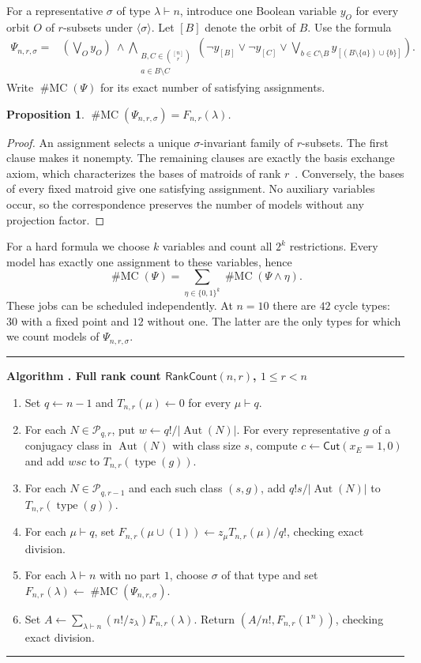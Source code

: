 \documentclass[11pt]{article}
\newtheorem{proposition}[theorem]{Proposition}
\theoremstyle{definition}
\newcounter{algorithm}
\newenvironment{algorithm}[1]{%
  \refstepcounter{algorithm}\par\medskip\noindent
  \begin{minipage}{\linewidth}\hrule\medskip
  \textbf{Algorithm \thealgorithm. #1}\par\smallskip
  \begin{enumerate}[label=\arabic*.,leftmargin=2.2em,itemsep=2pt,topsep=0pt]
}{\end{enumerate}\medskip\hrule\end{minipage}\par\medskip}
\DeclareMathOperator{\Aut}{Aut}
\DeclareMathOperator{\type}{type}
\newcommand{\mc}{\operatorname{\#MC}}
\newcommand{\Cut}{\mathsf{Cut}}
\newcommand{\Part}{\mathcal P}
\begin{document}
For a representative $\sigma$ of type $\lambda\vdash n$, introduce one
Boolean variable $y_O$ for every orbit $O$ of $r$-subsets under
$\langle\sigma\rangle$. Let $[B]$ denote the orbit of $B$. Use the formula
\begin{align}
\Psi_{n,r,\sigma}={}&\left(\bigvee_O y_O\right)\ \land
\bigwedge_{\substack{B,C\in\binom{[n]}r\\a\in B\setminus C}}
\left(\neg y_{[B]}\lor\neg y_{[C]}\lor
 \bigvee_{b\in C\setminus B}y_{[(B\setminus\{a\})\cup\{b\}]}\right).
\label{eq:bases}
\end{align}
Write $\mc(\Psi)$ for its exact number of satisfying assignments.

\begin{proposition}\label{prop:bases}
$\mc(\Psi_{n,r,\sigma})=F_{n,r}(\lambda)$.
\end{proposition}
\begin{proof}
An assignment selects a unique $\sigma$-invariant family of $r$-subsets.
The first clause makes it nonempty. The remaining clauses are exactly the
basis exchange axiom, which characterizes the bases of matroids of rank
$r$~\cite[Section 1.2]{Oxley}. Conversely, the bases of every fixed matroid give one satisfying
assignment. No auxiliary variables occur, so the correspondence preserves
the number of models without any projection factor.
\end{proof}

For a hard formula we choose $k$ variables and count all $2^k$ restrictions.
Every model has exactly one assignment to these variables, hence
\begin{equation}\label{eq:cubes}
\mc(\Psi)=\sum_{\eta\in\{0,1\}^k}\mc(\Psi\land\eta).
\end{equation}
These jobs can be scheduled independently. At $n=10$ there are $42$ cycle
types: $30$ with a fixed point and $12$ without one. The latter are the
only types for which we count models of $\Psi_{n,r,\sigma}$.

\begin{algorithm}{Full rank count $\mathsf{RankCount}(n,r)$, $1\le r<n$}
\label{alg:rank}
\item Set $q\gets n-1$ and $T_{n,r}(\mu)\gets0$ for every $\mu\vdash q$.
\item For each $N\in\Part_{q,r}$, put $w\gets q!/|\Aut(N)|$.
      For every representative $g$ of a conjugacy class in $\Aut(N)$ with class
      size $s$, compute $c\gets\Cut(x_E=1,0)$ and add $ws c$ to
      $T_{n,r}(\type(g))$.
\item For each $N\in\Part_{q,r-1}$ and each such class $(s,g)$,
      add $q!s/|\Aut(N)|$ to $T_{n,r}(\type(g))$.
\item For each $\mu\vdash q$, set
      $F_{n,r}(\mu\cup(1))\gets z_\mu T_{n,r}(\mu)/q!$, checking exact division.
\item For each $\lambda\vdash n$ with no part $1$, choose $\sigma$ of that
      type and set $F_{n,r}(\lambda)\gets\mc(\Psi_{n,r,\sigma})$.
\item Set $A\gets\sum_{\lambda\vdash n}(n!/z_\lambda)F_{n,r}(\lambda)$.
      Return $(A/n!,F_{n,r}(1^n))$, checking exact division.
\end{algorithm}
\end{document}

